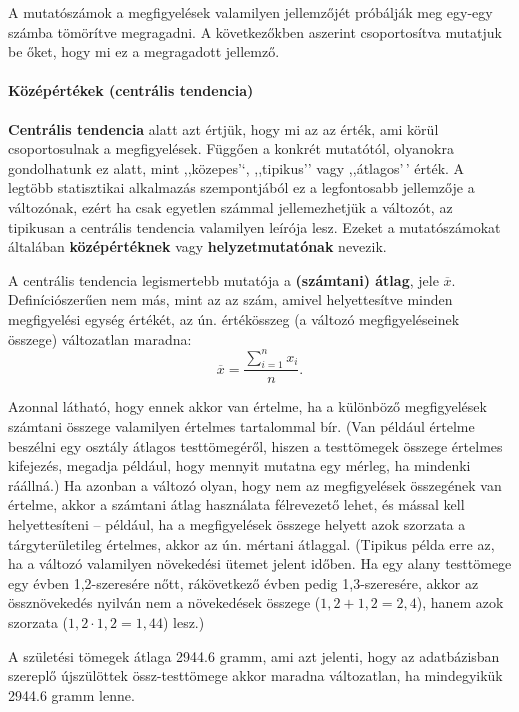 \documentclass[
]{book}
\begin{document}
A mutatószámok a megfigyelések valamilyen jellemzőjét próbálják meg egy-egy számba tömörítve megragadni. A következőkben aszerint csoportosítva mutatjuk be őket, hogy mi ez a megragadott jellemző.

\hypertarget{deskriptivmennyegyvaltanalitikusmutatoszamokcentralistendencia}{%
\paragraph{Középértékek (centrális tendencia)}\label{deskriptivmennyegyvaltanalitikusmutatoszamokcentralistendencia}}

\textbf{Centrális tendencia} alatt azt értjük, hogy mi az az érték, ami körül csoportosulnak a megfigyelések. Függően a konkrét mutatótól, olyanokra gondolhatunk ez alatt, mint ,,közepes'`, ,,tipikus'' vagy ,,átlagos'\,' érték. A legtöbb statisztikai alkalmazás szempontjából ez a legfontosabb jellemzője a változónak, ezért ha csak egyetlen számmal jellemezhetjük a változót, az tipikusan a centrális tendencia valamilyen leírója lesz. Ezeket a mutatószámokat általában \textbf{középértéknek} vagy \textbf{helyzetmutatónak} nevezik.

A centrális tendencia legismertebb mutatója a \textbf{(számtani) átlag}, jele \(\overline{x}\). Definíciószerűen nem más, mint az az szám, amivel helyettesítve minden megfigyelési egység értékét, az ún. értékösszeg (a változó megfigyeléseinek összege) változatlan maradna:
\[
    \overline{x}=\frac{\sum_{i=1}^n x_i}{n}.
\]

Azonnal látható, hogy ennek akkor van értelme, ha a különböző megfigyelések számtani összege valamilyen értelmes tartalommal bír. (Van például értelme beszélni egy osztály átlagos testtömegéről, hiszen a testtömegek összege értelmes kifejezés, megadja például, hogy mennyit mutatna egy mérleg, ha mindenki ráállná.) Ha azonban a változó olyan, hogy nem az megfigyelések összegének van értelme, akkor a számtani átlag használata félrevezető lehet, és mással kell helyettesíteni -- például, ha a megfigyelések összege helyett azok szorzata a tárgyterületileg értelmes, akkor az ún. mértani átlaggal. (Tipikus példa erre az, ha a változó valamilyen növekedési ütemet jelent időben. Ha egy alany testtömege egy évben 1,2-szeresére nőtt, rákövetkező évben pedig 1,3-szeresére, akkor az össznövekedés nyilván nem a növekedések összege (\(1,\!2 + 1,\!2 = 2,\!4\)), hanem azok szorzata (\(1,\!2 \cdot 1,\!2 = 1,\!44\)) lesz.)

A születési tömegek átlaga 2944.6 gramm, ami azt jelenti, hogy az adatbázisban szereplő újszülöttek össz-testtömege akkor maradna változatlan, ha mindegyikük 2944.6 gramm lenne.
\end{document}
